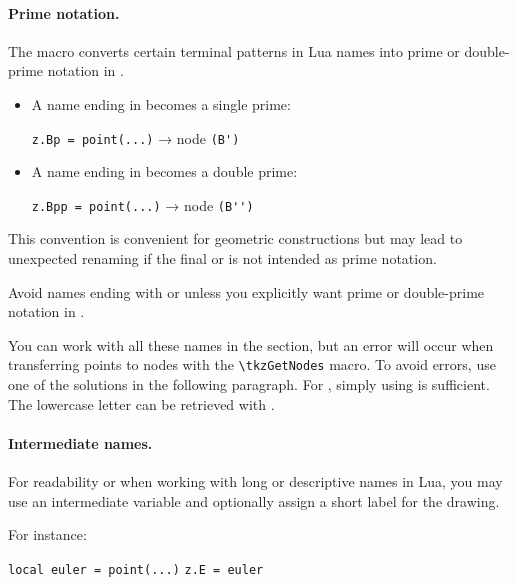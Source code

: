 \paragraph{Prime notation.}

The macro  converts certain terminal patterns in
Lua names into prime or double-prime notation in \TIKZ.

\begin{itemize}
  \item A name ending in  becomes a single prime:
        \begin{mybox}
        \verb|z.Bp = point(...)|  →  node \verb|(B')|
        \end{mybox}

  \item A name ending in  becomes a double prime:
        \begin{mybox}
        \verb|z.Bpp = point(...)| → node \verb|(B'')|
        \end{mybox}
\end{itemize}

This convention is convenient for geometric constructions but may lead to
unexpected renaming if the final  or  is not intended
as prime notation.

\begin{tcolorbox}[colback=red!7,colframe=red!60!black,title=Warning]
Avoid names ending with  or  unless you explicitly want
prime or double-prime notation in \TIKZ.
\end{tcolorbox}

\medskip
 You can work with all these names in the  section, but an error will occur when transferring points to nodes with the \verb|\tkzGetNodes| macro. To avoid errors, use one of the solutions in the following paragraph. For , simply using  is sufficient. The lowercase letter can be retrieved with \TIKZ{}.

\paragraph{Intermediate names.}

For readability or when working with long or descriptive names in Lua,
you may use an intermediate variable and optionally assign a short label
for the drawing.

For instance:

\begin{mybox}
\verb|local euler = point(...)|
\verb|z.E = euler|
\end{mybox}

